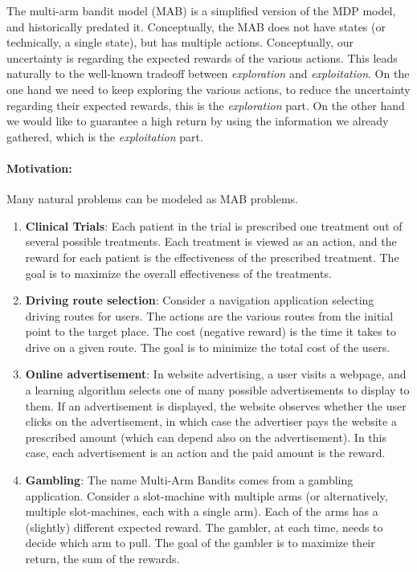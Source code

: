 
The multi-arm bandit model (MAB) is a simplified version of the MDP model, and historically predated it. Conceptually, the MAB does not have states (or technically, a single state), but has multiple actions. Conceptually, our uncertainty is regarding the expected rewards of the various actions. This leads naturally to the well-known tradeoff between \emph{exploration} and \emph{exploitation}. On the one hand we need to keep exploring the various actions, to reduce the uncertainty regarding their expected rewards, this is the \emph{exploration} part. On the other hand we would like to guarantee a high return by using the information we already gathered, which is the \emph{exploitation} part.

\paragraph{Motivation:} Many natural problems can be modeled as MAB problems.
\begin{enumerate}
\item \textbf{Clinical Trials}: Each patient in the trial is prescribed one treatment out of several possible treatments. Each treatment is viewed as an action, and the reward for each patient is the effectiveness of the prescribed treatment. The goal is to maximize the overall effectiveness of the treatments.
\item \textbf{Driving route selection}: Consider a navigation application selecting driving routes for users. The actions are the various routes from the initial point to the target place. The cost (negative reward) is the time it takes to drive on a given route. The goal is to minimize the total cost of the users.
\item \textbf{Online advertisement}: In website advertising, a user visits a webpage, and a learning algorithm selects one of many possible advertisements to display to them. If an advertisement is displayed, the website observes whether the user clicks on the advertisement, in which case the advertiser pays the website a prescribed amount (which can depend also on the advertisement). In this case, each advertisement is an action and the paid amount is the reward.
\item \textbf{Gambling}: The name Multi-Arm Bandits comes from a gambling application. Consider a slot-machine with multiple arms (or alternatively, multiple slot-machines, each with a single arm). Each of the arms has a (slightly) different expected reward. The gambler, at each time, needs to decide which arm to pull. The goal of the gambler is to maximize their return, the sum of the rewards.
\end{enumerate}

